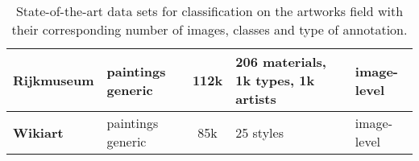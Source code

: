 \documentclass[acmlarge]{acmart}
\begin{document}
\begin{table}[t]
\begin{tabularx}{\linewidth}{|X|p{2.7cm}|c|m{3cm}|m{2.5cm}|}
\textbf{Rijkmuseum} \cite{MensinkICMIR2014, sabatelli2018deep} & paintings generic & 112k & 206 materials, \newline 1k types, \newline 1k artists & image-level  \\
    \hline
\textbf{Wikiart} \cite{karayev2013recognizing} & paintings generic & 85k & 25 styles & image-level \\
    \hline
\end{tabularx}
\caption{State-of-the-art data sets for classification on the artworks field with their corresponding number of images, classes and type of annotation.}
\label{tab:artdatasets}
\end{table}
\end{document}
